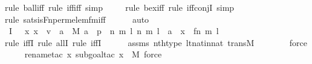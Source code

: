 \begin{isabellebody}
{\isacharparenleft}{\kern0pt}rule\ ball{\isacharunderscore}{\kern0pt}iff{\isacharcomma}{\kern0pt}\ rule\ iff{\isacharunderscore}{\kern0pt}iff{\isacharcomma}{\kern0pt}\ simp{\isacharparenright}{\kern0pt}\isanewline
\ \ \ \ \isamarkupfalse%
{\isacharparenleft}{\kern0pt}rule\ bex{\isacharunderscore}{\kern0pt}iff{\isacharcomma}{\kern0pt}\ rule\ iff{\isacharunderscore}{\kern0pt}conjI{}{\isacharcomma}{\kern0pt}\ simp{\isacharparenright}{\kern0pt}\isanewline
\ \ \ \ \isamarkupfalse%
{\isacharparenleft}{\kern0pt}rule\ sats{\isacharunderscore}{\kern0pt}is{\isacharunderscore}{\kern0pt}Fn{\isacharunderscore}{\kern0pt}perm{\isacharunderscore}{\kern0pt}elem{\isacharunderscore}{\kern0pt}fm{\isacharunderscore}{\kern0pt}iff{\isacharparenright}{\kern0pt}\isanewline
\ \ \ \ \isamarkupfalse%
\ auto\isanewline
\ \ \isamarkupfalse%
\ I{}{\isacharcolon}{\kern0pt}\ {\isachardoublequoteopen}{\isachardot}{\kern0pt}{\isachardot}{\kern0pt}{\isachardot}{\kern0pt}\ {\isasymlongleftrightarrow}\ {\isacharparenleft}{\kern0pt}{\isasymforall}x{\isachardot}{\kern0pt}\ x\ {\isasymin}\ v\ {\isasymlongleftrightarrow}\ {\isacharparenleft}{\kern0pt}{\isasymexists}a\ {\isasymin}\ M{\isachardot}{\kern0pt}\ a\ {\isasymin}\ p\ {\isasymand}\ {\isacharparenleft}{\kern0pt}{\isasymexists}n\ m\ l{\isachardot}{\kern0pt}\ {\isacharless}{\kern0pt}{\isacharless}{\kern0pt}n{\isacharcomma}{\kern0pt}\ m{\isachargreater}{\kern0pt}{\isacharcomma}{\kern0pt}\ l{\isachargreater}{\kern0pt}\ {\isacharequal}{\kern0pt}\ a\ {\isasymand}\ x\ {\isacharequal}{\kern0pt}\ {\isacharless}{\kern0pt}{\isacharless}{\kern0pt}f{\isacharbackquote}{\kern0pt}n{\isacharcomma}{\kern0pt}\ m{\isachargreater}{\kern0pt}{\isacharcomma}{\kern0pt}\ l{\isachargreater}{\kern0pt}{\isacharparenright}{\kern0pt}{\isacharparenright}{\kern0pt}{\isacharparenright}{\kern0pt}{\isachardoublequoteclose}\isanewline
\ \ \ \ \isamarkupfalse%
{\isacharparenleft}{\kern0pt}rule\ iffI{\isacharcomma}{\kern0pt}\ rule\ allI{\isacharcomma}{\kern0pt}\ rule\ iffI{\isacharparenright}{\kern0pt}\isanewline
\ \ \ \ \isamarkupfalse%
\ assms\ nth{\isacharunderscore}{\kern0pt}type\ lt{\isacharunderscore}{\kern0pt}nat{\isacharunderscore}{\kern0pt}in{\isacharunderscore}{\kern0pt}nat\ transM\isanewline
\ \ \ \ \ \ \isamarkupfalse%
\ force\isanewline
\ \ \ \ \isamarkupfalse%
{\isacharparenleft}{\kern0pt}rename{\isacharunderscore}{\kern0pt}tac\ x{\isacharcomma}{\kern0pt}\ subgoal{\isacharunderscore}{\kern0pt}tac\ {\isachardoublequoteopen}x\ {\isasymin}\ M{\isachardoublequoteclose}{\isacharcomma}{\kern0pt}\ force{\isacharparenright}{\kern0pt}\isanewline

\end{isabellebody}

